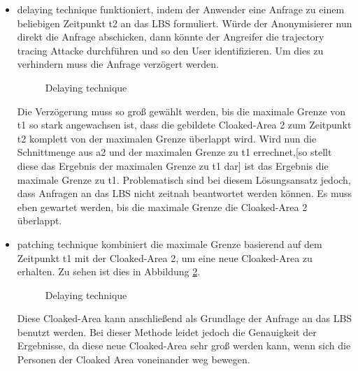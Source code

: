 \begin{itemize} 
\item{delaying technique} funktioniert, indem der Anwender eine Anfrage zu einem beliebigen Zeitpunkt t2 an das LBS formuliert. Würde der Anonymisierer nun direkt die Anfrage abschicken, dann könnte der Angreifer die trajectory tracing Attacke durchführen und so den User identifizieren. Um dies zu verhindern muss die Anfrage verzögert werden. 
\begin{figure}[!h]
		\centering
		\caption{Delaying technique}
		\label{fig_chow2011_delaying-tech}
\end{figure}
Die Verzögerung muss so groß gewählt werden, bis die maximale Grenze von t1 so stark angewachsen ist, dass die gebildete Cloaked-Area 2 zum Zeitpunkt t2 komplett von der maximalen Grenze überlappt wird. Wird nun die Schnittmenge aus a2 und der maximalen Grenze zu t1 errechnet,[so stellt diese das Ergebnis der maximalen Grenze zu t1 dar] ist das Ergebnis die maximale Grenze zu t1. Problematisch sind bei diesem Lösungsansatz jedoch, dass Anfragen an das LBS nicht zeitnah beantwortet werden können. Es muss eben gewartet werden, bis die maximale Grenze die Cloaked-Area 2 überlappt. 
\item{patching technique} kombiniert die maximale Grenze basierend auf dem Zeitpunkt t1 mit der Cloaked-Area 2, um eine neue Cloaked-Area zu erhalten. Zu sehen ist dies in Abbildung \ref{fig_chow2011_patching-tech}.
\begin{figure}[!h]
		\centering
		\caption{Delaying technique}
		\label{fig_chow2011_patching-tech}
\end{figure}
Diese Cloaked-Area kann anschließend als Grundlage der Anfrage an das LBS benutzt werden. Bei dieser Methode leidet jedoch die Genauigkeit der Ergebnisse, da diese neue Cloaked-Area sehr groß werden kann, wenn sich die Personen der Cloaked Area voneinander weg bewegen.  
\end{itemize} 
